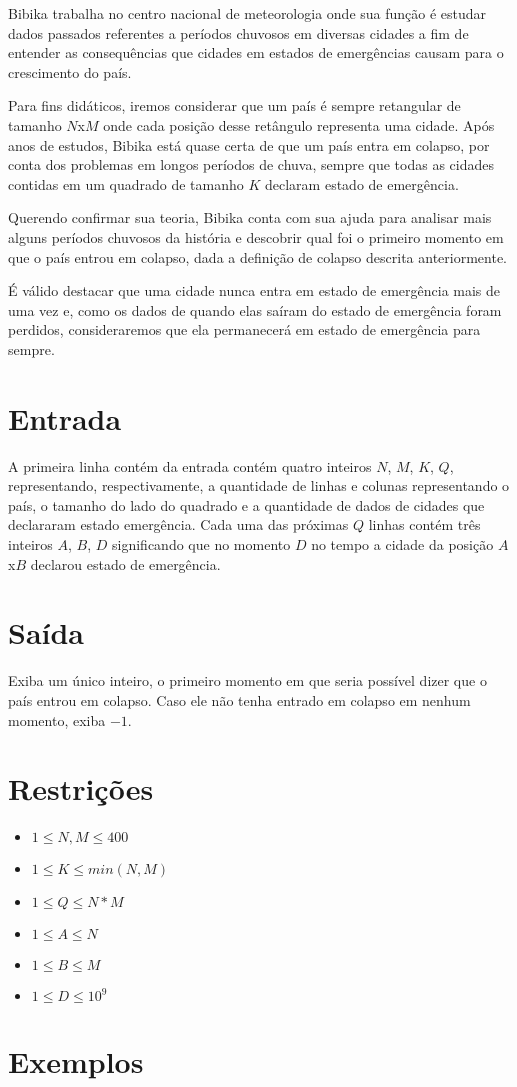 Bibika trabalha no centro nacional de meteorologia onde sua função é estudar dados passados referentes a períodos chuvosos em diversas cidades a fim de entender as consequências que cidades em estados de emergências causam para o crescimento do país.

Para fins didáticos, iremos considerar que um país é sempre retangular de tamanho $N$x$M$ onde cada posição desse retângulo representa uma cidade. Após anos de estudos, Bibika está quase certa de que um país entra em colapso, por conta dos problemas em longos períodos de chuva, sempre que todas as cidades contidas em um quadrado de tamanho $K$ declaram estado de emergência.

Querendo confirmar sua teoria, Bibika conta com sua ajuda para analisar mais alguns períodos chuvosos da história e descobrir qual foi o primeiro momento em que o país entrou em colapso, dada a definição de colapso descrita anteriormente.

É válido destacar que uma cidade nunca entra em estado de emergência mais de uma vez e, como os dados de quando elas saíram do estado de emergência foram perdidos, consideraremos que ela permanecerá em estado de emergência para sempre.

\section*{Entrada}

A primeira linha contém da entrada contém quatro inteiros $N$, $M$, $K$, $Q$, representando, respectivamente, a quantidade de linhas e colunas representando o país, o tamanho do lado do quadrado e a quantidade de dados de cidades que declararam estado emergência.
Cada uma das próximas $Q$ linhas contém três inteiros $A$, $B$, $D$ significando que no momento $D$ no tempo a cidade da posição $A$x$B$ declarou estado de emergência. 

\section*{Saída}

Exiba um único inteiro, o primeiro momento em que seria possível dizer que o país entrou em colapso. 
Caso ele não tenha entrado em colapso em nenhum momento, exiba $-1$.

\section*{Restrições}

\begin{itemize}
\item $1 \leq N, M \leq 400$
\item $1 \leq K \leq min(N, M)$
\item $1 \leq Q \leq N*M$
\item $1 \leq A \leq N$
\item $1 \leq B \leq M$
\item $1 \leq D \leq 10^9$
\end{itemize}


\section*{Exemplos}

\exemplo
